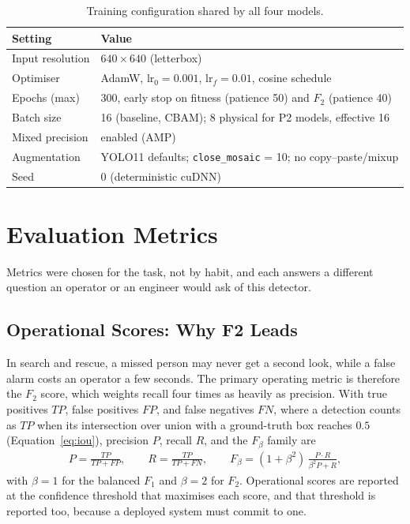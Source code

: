 \begin{table}[H]
  \centering
  \caption{Training configuration shared by all four models.}
  \label{tab:setup}
  \begin{tabular}{@{}l l@{}}
    \toprule
    Setting & Value \\
    \midrule
    Input resolution & $640 \times 640$ (letterbox) \\
    Optimiser & AdamW, $\text{lr}_0 = 0.001$, $\text{lr}_f = 0.01$, cosine schedule \\
    Epochs (max) & 300, early stop on fitness (patience 50) and $F_2$ (patience 40) \\
    Batch size & 16 (baseline, CBAM); 8 physical for P2 models, effective 16 \\
    Mixed precision & enabled (AMP) \\
    Augmentation & YOLO11 defaults; \texttt{close\_mosaic} = 10; no copy--paste/mixup \\
    Seed & 0 (deterministic cuDNN) \\
    \bottomrule
  \end{tabular}
\end{table}

\section{Evaluation Metrics}
\label{sec:metrics}
Metrics were chosen for the task, not by habit, and each answers a different
question an operator or an engineer would ask of this detector.

\subsection{Operational Scores: Why F2 Leads}
In search and rescue, a missed person may never get a second look, while a
false alarm costs an operator a few seconds. The primary operating metric is
therefore the $F_2$ score, which weights recall four times as heavily as
precision. With true positives $\mathit{TP}$, false positives $\mathit{FP}$,
and false negatives $\mathit{FN}$, where a detection counts as $\mathit{TP}$
when its intersection over union with a ground-truth box reaches $0.5$
(Equation~\ref{eq:iou}), precision $P$, recall $R$, and the $F_\beta$ family
are
\begin{align}
  P = \frac{\mathit{TP}}{\mathit{TP}+\mathit{FP}}, \qquad
  R = \frac{\mathit{TP}}{\mathit{TP}+\mathit{FN}}, \qquad
  F_\beta = (1+\beta^{2})\,\frac{P \cdot R}{\beta^{2} P + R},
\end{align}
with $\beta = 1$ for the balanced $F_1$ and $\beta = 2$ for $F_2$. Operational
scores are reported at the confidence threshold that maximises each score, and
that threshold is reported too, because a deployed system must commit to one.

